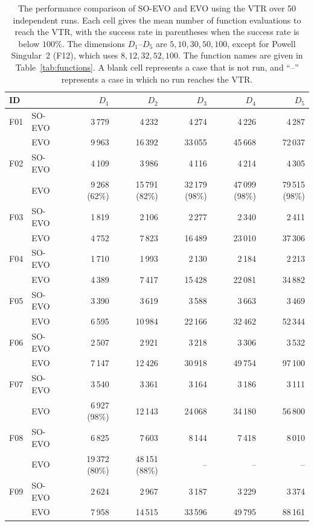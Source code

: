 \begin{table}[htbp]
\centering\footnotesize
\caption{The performance comparison of SO-EVO and EVO using the VTR over 50 independent runs. Each cell gives the mean number of function evaluations to reach the VTR, with the success rate in parentheses when the success rate is below $100\%$. The dimensions $D_1$--$D_5$ are $5,10,30,50,100$, except for Powell Singular~2 (F12), which uses $8,12,32,52,100$. The function names are given in Table~\ref{tab:functions}. A blank cell represents a case that is not run, and ``--'' represents a case in which no run reaches the VTR.}
\label{tab:main_percase}
\begin{tabular}{llrrrrr}
\toprule
ID & & $D_1$ & $D_2$ & $D_3$ & $D_4$ & $D_5$ \\
\midrule
F01 & SO-EVO & 3\,779 & 4\,232 & 4\,274 & 4\,226 & 4\,287 \\
 & EVO & 9\,963 & 16\,392 & 33\,055 & 45\,668 & 72\,037 \\[2pt]
F02 & SO-EVO & 4\,109 & 3\,986 & 4\,116 & 4\,214 & 4\,305 \\
 & EVO & 9\,268 (62\%) & 15\,791 (82\%) & 32\,179 (98\%) & 47\,099 (98\%) & 79\,515 (98\%) \\[2pt]
F03 & SO-EVO & 1\,819 & 2\,106 & 2\,277 & 2\,340 & 2\,411 \\
 & EVO & 4\,752 & 7\,823 & 16\,489 & 23\,010 & 37\,306 \\[2pt]
F04 & SO-EVO & 1\,710 & 1\,993 & 2\,130 & 2\,184 & 2\,213 \\
 & EVO & 4\,389 & 7\,417 & 15\,428 & 22\,081 & 34\,882 \\[2pt]
F05 & SO-EVO & 3\,390 & 3\,619 & 3\,588 & 3\,663 & 3\,469 \\
 & EVO & 6\,595 & 10\,984 & 22\,166 & 32\,462 & 52\,344 \\[2pt]
F06 & SO-EVO & 2\,507 & 2\,921 & 3\,218 & 3\,306 & 3\,532 \\
 & EVO & 7\,147 & 12\,426 & 30\,918 & 49\,754 & 97\,100 \\[2pt]
F07 & SO-EVO & 3\,540 & 3\,361 & 3\,164 & 3\,186 & 3\,111 \\
 & EVO & 6\,927 (98\%) & 12\,143 & 24\,068 & 34\,180 & 56\,800 \\[2pt]
F08 & SO-EVO & 6\,825 & 7\,603 & 8\,144 & 7\,418 & 8\,010 \\
 & EVO & 19\,372 (80\%) & 48\,151 (88\%) & -- & -- & -- \\[2pt]
F09 & SO-EVO & 2\,624 & 2\,967 & 3\,187 & 3\,229 & 3\,374 \\
 & EVO & 7\,958 & 14\,515 & 33\,596 & 49\,795 & 88\,161 \\[2pt]

\end{tabular}
\end{table}

